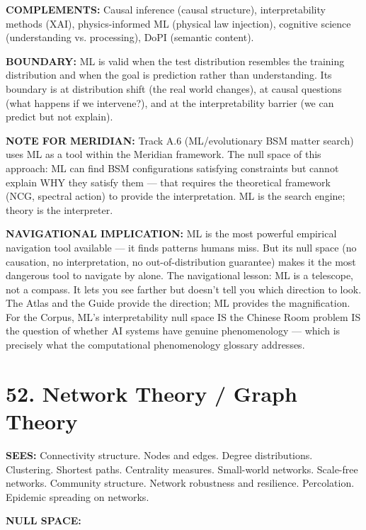 \textbf{COMPLEMENTS:} Causal inference (causal structure), interpretability methods (XAI), physics-informed ML (physical law injection), cognitive science (understanding vs. processing), DoPI (semantic content).


\textbf{BOUNDARY:} ML is valid when the test distribution resembles the training distribution and when the goal is prediction rather than understanding. Its boundary is at distribution shift (the real world changes), at causal questions (what happens if we intervene?), and at the interpretability barrier (we can predict but not explain).


\textbf{NOTE FOR MERIDIAN:} Track A.6 (ML/evolutionary BSM matter search) uses ML as a tool within the Meridian framework. The null space of this approach: ML can find BSM configurations satisfying constraints but cannot explain WHY they satisfy them — that requires the theoretical framework (NCG, spectral action) to provide the interpretation. ML is the search engine; theory is the interpreter.


\textbf{NAVIGATIONAL IMPLICATION:} ML is the most powerful empirical navigation tool available — it finds patterns humans miss. But its null space (no causation, no interpretation, no out-of-distribution guarantee) makes it the most dangerous tool to navigate by alone. The navigational lesson: ML is a telescope, not a compass. It lets you see farther but doesn't tell you which direction to look. The Atlas and the Guide provide the direction; ML provides the magnification. For the Corpus, ML's interpretability null space IS the Chinese Room problem IS the question of whether AI systems have genuine phenomenology — which is precisely what the computational phenomenology glossary addresses.


\bigskip\noindent\makebox[\textwidth]{\color{rulegray}\rule{5cm}{0.3pt}}\bigskip


\section*{52. Network Theory / Graph Theory}


\textbf{SEES:} Connectivity structure. Nodes and edges. Degree distributions. Clustering. Shortest paths. Centrality measures. Small-world networks. Scale-free networks. Community structure. Network robustness and resilience. Percolation. Epidemic spreading on networks.


\textbf{NULL SPACE:}


